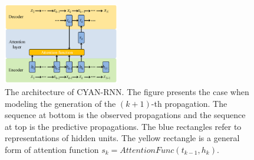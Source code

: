 \begin{figure}[t]
\centering
\includegraphics[width=0.45\textwidth]{figs/cyanrnn_framework.png}
\caption{The architecture of CYAN-RNN. The figure presents the case when
modeling the generation of the $(k+1)$-th propagation. The sequence at bottom is
the observed propagations and the sequence at top is the predictive
propagations. The blue rectangles refer to representations of hidden units.
The yellow rectangle is a general form of attention function
$s_k=\textit{AttentionFunc}(t_{k-1}, h_k)$.}
\label{fig:cyrnn_frame}
\end{figure}

